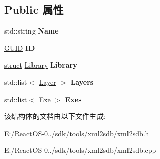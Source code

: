 \subsection*{Public 属性}
\begin{DoxyCompactItemize}
\item 
\mbox{\label{struct_database_afca9f728383b38e513476c31716d48ae}} 
std\+::string {\bfseries Name}
\item 
\mbox{\label{struct_database_a134406831b82198c31b038b51b0d0dba}} 
\hyperlink{interface_g_u_i_d}{G\+U\+ID} {\bfseries ID}
\item 
\mbox{\label{struct_database_a5a427c81e2a301c351deb142e4ac1ab0}} 
\hyperlink{interfacestruct}{struct} \hyperlink{struct_library}{Library} {\bfseries Library}
\item 
\mbox{\label{struct_database_adce66a65e885c3654c439f95b4746fd9}} 
std\+::list$<$ \hyperlink{struct_layer}{Layer} $>$ {\bfseries Layers}
\item 
\mbox{\label{struct_database_a97ae7645a710a8dc39d1d6c595d7f2dc}} 
std\+::list$<$ \hyperlink{struct_exe}{Exe} $>$ {\bfseries Exes}
\end{DoxyCompactItemize}


该结构体的文档由以下文件生成\+:\begin{DoxyCompactItemize}
\item 
E\+:/\+React\+O\+S-\/0../sdk/tools/xml2sdb/xml2sdb.\+h\item 
E\+:/\+React\+O\+S-\/0../sdk/tools/xml2sdb/xml2sdb.\+cpp\end{DoxyCompactItemize}

